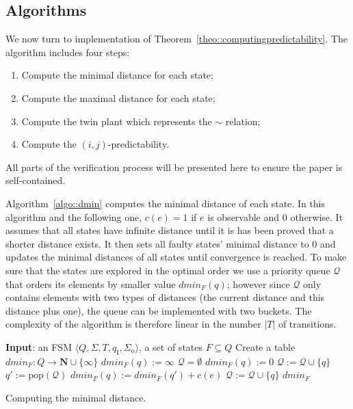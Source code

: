\documentclass{article}
\newcommand{\qi}[0]{q_{\mathrm{I}}}
\newcommand{\sigmao}[0]{\Sigma_{\mathrm{o}}}
\newcommand{\dmin}[1]{\mathit{dmin}_{#1}}
\newcommand{\set}[1]{\{#1\}}
\newcommand{\queue}[0]{\mathcal{Q}}
\begin{document}
\subsection{Algorithms}


We now turn to implementation of Theorem~\ref{theo::computingpredictability}.  
The algorithm includes four steps: 
\begin{enumerate}
\item 
  Compute the minimal distance for each state; 
\item 
  Compute the maximal distance for each state; 
\item 
  Compute the twin plant which represents the $\sim$ relation; 
\item 
  Compute the $(i,j)$-predictability.  
\end{enumerate}
All parts of the verification process will be presented here 
to ensure the paper is self-contained.  

Algorithm~\ref{algo::dmin} computes the minimal distance of each state.  
In this algorithm and the following one, 
$c(e) = 1$ if $e$ is observable and $0$ otherwise.  
It assumes that all states have infinite distance 
until it is has been proved that a shorter distance exists.  
It then sets all faulty states' minimal distance to $0$ 
and updates the minimal distances of all states 
until convergence is reached.  
To make sure that the states are explored in the optimal order 
we use a priority queue $\queue$ 
that orders its elements by smaller value $\dmin{F}(q)$; 
however since $\queue$ only contains elements 
with two types of distances 
(the current distance and this distance plus one), 
the queue can be implemented with two buckets.  
The complexity of the algorithm is therefore linear 
in the number $|T|$ of transitions.  

\begin{algorithm}[ht]
  \begin{algorithmic}
  \STATE 
    {\bf Input}: an FSM $\langle Q,\Sigma,T,\qi,\sigmao\rangle$, 
    a set of states $F \subseteq Q$
  \STATE 
    Create a table $\dmin{F}: Q \rightarrow \mathbf{N} \cup \{\infty\}$
    \STATE $\dmin{F}(q) := \infty$
  \ENDFOR
  \STATE 
    $\queue = \emptyset$
    \STATE $\dmin{F}(q) := 0$
    \STATE $\queue := \queue \cup \set{q}$
  \ENDFOR
  \WHILE{$\queue \neq \emptyset$} 
    \STATE $q' := \mathrm{pop}(\queue)$
      \IF{$\dmin{F}(q) > \dmin{F}(q') + c(e)$}
        \STATE $\dmin{F}(q) := \dmin{F}(q') + c(e)$
        \STATE $\queue := \queue \cup \set{q}$
      \ENDIF
    \ENDFOR
  \ENDWHILE
   $\dmin{F}$ 
  \end{algorithmic}
  \caption{Computing the minimal distance.}
  \label{algo::dmin}
\end{algorithm}
\end{document}
